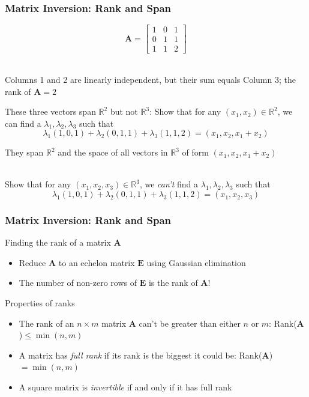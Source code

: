 \documentclass{beamer}
\numberwithin{equation}{section}
\begin{document}
\begin{frame}
\frametitle{Matrix Inversion: Rank and Span}

$$\mathbf{A}=\begin{bmatrix}
1&0&1\\
0&1&1\\
1&1&2
\end{bmatrix}$$ \pause

\ \\Columns 1 and 2 are linearly independent, but their sum equals Column 3; the rank of $\mathbf{A}=2$ \pause

These three vectors span $\mathbb{R}^2$ but not $\mathbb{R}^3$: Show that for any $(x_1, x_2)\in \mathbb{R}^2$, we can find a $\lambda_1, \lambda_2, \lambda_3$ such that $$\lambda_1(1, 0, 1)+\lambda_2(0, 1, 1)+\lambda_3(1, 1, 2)=(x_1, x_2, x_1+x_2)$$ \pause

They span $\mathbb{R}^2$ and the space of all vectors in $\mathbb{R}^3$ of form $(x_1, x_2, x_1+x_2)$ \pause

\ \\Show that for any $(x_1, x_2, x_3)\in \mathbb{R}^3$, we \textit{can't} find a $\lambda_1, \lambda_2, \lambda_3$ such that $$\lambda_1(1, 0, 1)+\lambda_2(0, 1, 1)+\lambda_3(1, 1, 2)=(x_1, x_2, x_3)$$

\end{frame}



\begin{frame}
\frametitle{Matrix Inversion: Rank and Span}

Finding the rank of a matrix $\mathbf{A}$ \pause

\begin{itemize}
\item Reduce $\mathbf{A}$ to an echelon matrix $\mathbf{E}$ using Gaussian elimination \pause
\item The number of non-zero rows of $\mathbf{E}$ is the rank of $\mathbf{A}$! \pause
\end{itemize}

\vspace{.3in}
Properties of ranks \pause

\begin{itemize}
\item The rank of an $n\times m$ matrix  $\mathbf{A}$ can't be greater than either $n$ or $m$: Rank($\mathbf{A}$)$\leq \min (n, m)$ \pause
\item A matrix has \textit{full rank} if its rank is the biggest it could be: Rank($\mathbf{A}$)$= \min (n, m)$ \pause
\item A square matrix is \textit{invertible} if and only if it has full rank
\end{itemize}
\end{frame}
\end{document}
